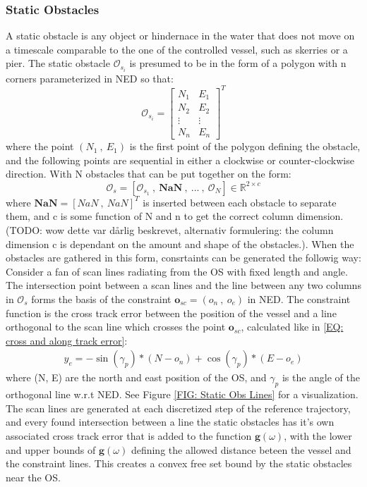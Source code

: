 \subsubsection*{Static Obstacles}
A static obstacle is any object or hindernace in the water that does not move on a timescale comparable to the one of the controlled
vessel, such as skerries or a pier. The static obstacle $\mathcal{O}_{s_{i}}$ is presumed to be in the form of a polygon with n corners parameterized
in NED so that:
\begin{equation}
    \mathcal{O}_{s_{i}} = \begin{bmatrix}
                              N_1 & E_1 \\
                              N_2 & E_2 \\
                            \vdots & \vdots\\
                              N_n & E_n
                            \end{bmatrix}^T
\end{equation}
where the point $(N_1 \ , \ E_1)$ is the first point of the polygon defining the obstacle, and the following points are sequential in either a clockwise
or counter-clockwise direction. With N obstacles that can be put together on the form:
\begin{equation}
    \mathcal{O}_s = [\mathcal{O}_{s_{1}} \ , \ \textbf{NaN} \ , \ ... \ , \ \mathcal{O}_N] \in \mathbb{R}^{2 \times c}
\end{equation}
where $\textbf{NaN} = [NaN \ , \ NaN]^T$ is inserted between each obstacle to separate them, and c is some function of N and n to get the correct column dimension.
(TODO: wow dette var dårlig beskrevet, alternativ formulering: the column dimension c is dependant on the amount and shape of the obstacles.). When the obstacles are gathered in this form, consrtaints can be generated the followig way:\newline
Consider a fan of scan lines radiating from the \gls{OS} with fixed length and angle. The intersection
point between a scan lines and the line between any two columns in $\mathcal{O}_s$ forms the basis of the constraint 
$\mathbf{o}_{sc} = (o_n \ , \ o_e)$ in NED.\newline
The constraint function is the cross track error between the position of the vessel and a line orthogonal to the scan line which crosses
the point $\mathbf{o}_{sc}$, calculated like in \eqref{EQ: cross and along track error}:
\begin{eqnarray}
    y_e = -\sin(\gamma_p)*(N-o_n) + \cos(\gamma_p)*(E-o_e)
\end{eqnarray}
where (N, E) are the north and east position of the \gls{OS}, and $\gamma_p$ is the angle of the orthogonal line w.r.t NED.
See Figure \ref{FIG: Static Obs Lines} for a visualization.
The scan lines are generated at each discretized step of the reference trajectory, and every found intersection between a 
line the static obstacles has it's own associated cross track error that is added to the function 
$\textbf{g}(\omega)$, with the lower and upper bounds of $\textbf{g}(\omega)$ defining the allowed distance beteen the vessel and the constraint lines.
This creates a convex free set bound by the static obstacles near the \gls{OS}.


